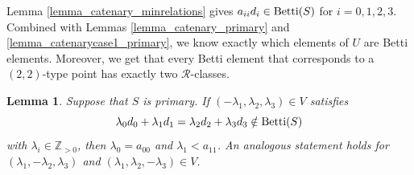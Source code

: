 \documentclass[12pt]{article}
\newtheorem{lemma}[thm]{Lemma}
\theoremstyle{remark}
\begin{document}
Lemma \ref{lemma_catenary_minrelations} gives $a_{ii}d_i \in \textup{Betti}(S)$ for $i = 0,1,2,3$. Combined with Lemmas \ref{lemma_catenary_primary} and \ref{lemma_catenarycase1_primary}, we know exactly which elements of $U$ are Betti elements. Moreover, we get that every Betti element that corresponds to a $(2,2)$-type point has exactly two $\mathcal{R}$-classes.



\begin{lemma}\label{lemma_catenaryT_primary}
    Suppose that $S$ is primary. If $(-\lambda_1,\lambda_2,\lambda_3) \in V$ satisfies
    $$ \lambda_0d_0 + \lambda_1d_1 = \lambda_2d_2 + \lambda_3d_3 \notin \textup{Betti}(S)$$
    with $\lambda_i \in \mathbb{Z}_{>0}$, then $\lambda_0 = a_{00}$ and $\lambda_1 < a_{11}$. An analogous statement holds for $(\lambda_1,-\lambda_2,\lambda_3)$ and $(\lambda_1,\lambda_2,-\lambda_3) \in V$. 
\end{lemma}
\end{document}
